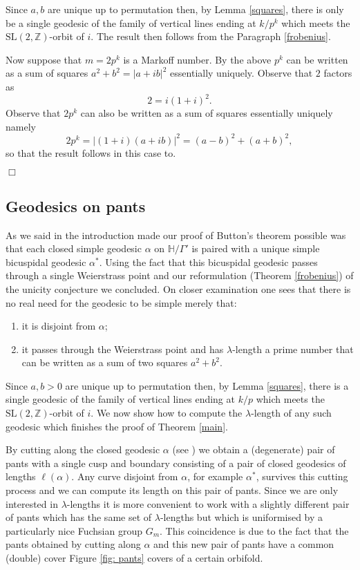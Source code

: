 \documentclass[12pt,a4paper]{amsart}
\def\HH{\mathbb{H}}
\def\xx{\HH/\Gamma'}
\def\ZZ{\mathbb{Z}}
\def\sl2{\mathrm{SL}(2, \ZZ)}
\def\GG{G_m}
\begin{document}
Since $a,b$ are unique up to permutation then, by Lemma \ref{squares}, there is
only be a single  geodesic of the family of vertical lines ending at  $k/p^k$
which meets the $\sl2$-orbit of $i$. The result then follows from the
Paragraph \ref{frobenius}.

Now suppose that  $m=2p^k$ is a Markoff number.
By the above  $p^k$ can be written as a sum of squares $a^2 + b^2 = |a + ib|^2$ 
essentially uniquely.
Observe that   $2$ factors as 
$$ 2 = i(1+i)^2.$$
Observe that $2 p^k$ can also  be written as a sum of squares
essentially uniquely namely
$$2p^k = |(1+i) (a + ib) |^2 =  (a-b)^2 + (a+b)^2,$$ 
so that the result follows in this case to.

\hfill $\Box$

\subsection{Geodesics on pants}\label{geos on pants}

As we said in the introduction made our proof of Button's theorem possible was
that  each closed simple geodesic $\alpha$ on $\xx$ is paired with a unique
simple bicuspidal geodesic $\alpha^*$. Using the fact that this bicuspidal
geodesic passes through a single Weierstrass point and our reformulation
(Theorem \ref{frobenius}) of the unicity conjecture we concluded. On closer
examination one sees that there is no real need for the geodesic to be simple
merely that:

\begin{enumerate}
	\item it is disjoint from $\alpha$;
	\item it passes through the Weierstrass point and has $\lambda$-length
		a prime number that can be written as a sum of two squares  $a^2 + b^2$.
\end{enumerate}

Since $a,b>0$ are unique up to permutation then, by Lemma \ref{squares}, there
is a single  geodesic of the family of vertical lines ending at  $k/p$ which
meets the $\sl2$-orbit of $i$. We now show how to compute the $\lambda$-length
of any such geodesic which finishes the proof of Theorem \ref{main}.

By cutting along the closed geodesic $\alpha$ (see \cite{thesis}) we obtain a
(degenerate) pair of pants with a single cusp and boundary consisting of a pair
of closed geodesics of lengths $\ell(\alpha)$. Any curve disjoint from
$\alpha$, for example $\alpha^*$, survives this cutting process and we can
compute its length on this pair of pants. Since we are only interested in
$\lambda$-lengths it is more convenient to work with a slightly different pair
of pants which has the same set of $\lambda$-lengths but which is uniformised
by a particularly nice Fuchsian group $\GG$. This coincidence is due to the
fact that the pants obtained by cutting along $\alpha$ and this new pair of
pants have a common (double) cover Figure \ref{fig: pants} covers of a certain
orbifold.
\end{document}
